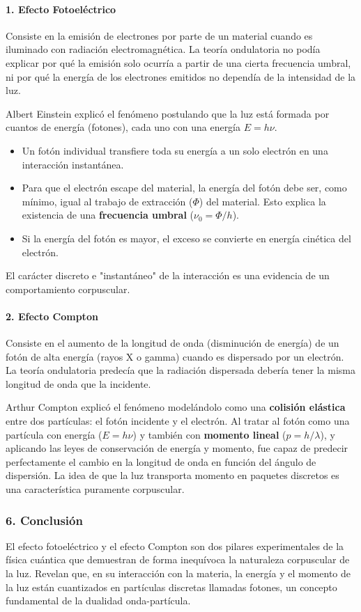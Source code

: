 \paragraph{1. Efecto Fotoeléctrico}
Consiste en la emisión de electrones por parte de un material cuando es iluminado con radiación electromagnética. La teoría ondulatoria no podía explicar por qué la emisión solo ocurría a partir de una cierta frecuencia umbral, ni por qué la energía de los electrones emitidos no dependía de la intensidad de la luz.

Albert Einstein explicó el fenómeno postulando que la luz está formada por cuantos de energía (fotones), cada uno con una energía $E=h\nu$.
\begin{itemize}
    \item Un fotón individual transfiere toda su energía a un solo electrón en una interacción instantánea.
    \item Para que el electrón escape del material, la energía del fotón debe ser, como mínimo, igual al trabajo de extracción ($\Phi$) del material. Esto explica la existencia de una \textbf{frecuencia umbral} ($\nu_0 = \Phi/h$).
    \item Si la energía del fotón es mayor, el exceso se convierte en energía cinética del electrón.
\end{itemize}
El carácter discreto e "instantáneo" de la interacción es una evidencia de un comportamiento corpuscular.

\paragraph{2. Efecto Compton}
Consiste en el aumento de la longitud de onda (disminución de energía) de un fotón de alta energía (rayos X o gamma) cuando es dispersado por un electrón. La teoría ondulatoria predecía que la radiación dispersada debería tener la misma longitud de onda que la incidente.

Arthur Compton explicó el fenómeno modelándolo como una \textbf{colisión elástica} entre dos partículas: el fotón incidente y el electrón. Al tratar al fotón como una partícula con energía ($E=h\nu$) y también con \textbf{momento lineal} ($p=h/\lambda$), y aplicando las leyes de conservación de energía y momento, fue capaz de predecir perfectamente el cambio en la longitud de onda en función del ángulo de dispersión. La idea de que la luz transporta momento en paquetes discretos es una característica puramente corpuscular.

\subsubsection*{6. Conclusión}
\begin{cajaconclusion}
El efecto fotoeléctrico y el efecto Compton son dos pilares experimentales de la física cuántica que demuestran de forma inequívoca la naturaleza corpuscular de la luz. Revelan que, en su interacción con la materia, la energía y el momento de la luz están cuantizados en partículas discretas llamadas fotones, un concepto fundamental de la dualidad onda-partícula.
\end{cajaconclusion}

